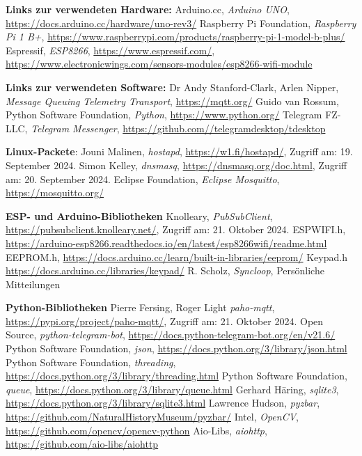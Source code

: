 \documentclass[12pt, letterpaper]{article}
\begin{document}
\begin{thebibliography}{20}
  \par \textbf{Links zur verwendeten Hardware:}
  Arduino.cc, \textit{Arduino UNO}, \url{https://docs.arduino.cc/hardware/uno-rev3/}
  Raspberry Pi Foundation, \textit{Raspberry Pi 1 B+}, \url{https://www.raspberrypi.com/products/raspberry-pi-1-model-b-plus/}
  Espressif, \textit{ESP8266}, \url{https://www.espressif.com/}, \url{https://www.electronicwings.com/sensors-modules/esp8266-wifi-module}
  \par \textbf{Links zur verwendeten Software:}
  Dr Andy Stanford-Clark, Arlen Nipper, \textit{Message Queuing Telemetry Transport}, \url{https://mqtt.org/}
  Guido van Rossum, Python Software Foundation, \textit{Python}, \url{https://www.python.org/}
  Telegram FZ-LLC, \textit{Telegram Messenger}, \url{https://github.com//telegramdesktop/tdesktop}
  \par \textbf{Linux-Packete}:
  Jouni Malinen, \textit{hostapd}, \url{https://w1.fi/hostapd/}, Zugriff am: 19. September 2024.
  Simon Kelley, \textit{dnsmasq}, \url{https://dnsmasq.org/doc.html}, Zugriff am: 20. September 2024.
  Eclipse Foundation, \textit{Eclipse Mosquitto}, \url{https://mosquitto.org/}
  \par \textbf{ESP- und Arduino-Bibliotheken}
  Knolleary, \textit{PubSubClient}, \url{https://pubsubclient.knolleary.net/}, Zugriff am: 21. Oktober 2024.
  ESPWIFI.h, \url{https://arduino-esp8266.readthedocs.io/en/latest/esp8266wifi/readme.html}
  EEPROM.h, \url{https://docs.arduino.cc/learn/built-in-libraries/eeprom/}
  Keypad.h \url{https://docs.arduino.cc/libraries/keypad/}
  R. Scholz, \textit{Syncloop}, Persönliche Mitteilungen
  \par \textbf{Python-Bibliotheken}
  Pierre Fersing, Roger Light \textit{paho-mqtt}, \url{https://pypi.org/project/paho-mqtt/}, Zugriff am: 21. Oktober 2024.
  Open Source, \textit{python-telegram-bot}, \url{https://docs.python-telegram-bot.org/en/v21.6/}
  Python Software Foundation, \textit{json}, \url{https://docs.python.org/3/library/json.html}
  Python Software Foundation, \textit{threading}, \url{https://docs.python.org/3/library/threading.html}
  Python Software Foundation, \textit{queue}, \url{https://docs.python.org/3/library/queue.html}
  Gerhard Häring, \textit{sqlite3}, \url{https://docs.python.org/3/library/sqlite3.html}
  Lawrence Hudson, \textit{pyzbar}, \url{https://github.com/NaturalHistoryMuseum/pyzbar/}
  Intel, \textit{OpenCV}, \url{https://github.com/opencv/opencv-python}
  Aio-Libs, \textit{aiohttp}, \url{https://github.com/aio-libs/aiohttp}
\end{thebibliography}



\listoffigures
{}

\listoftables
\lstlistoflistings
{}
\end{document}
